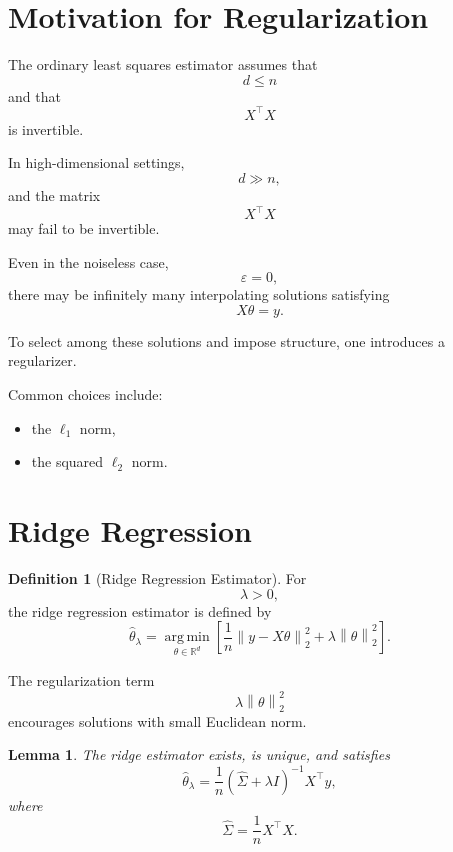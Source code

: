 \documentclass[12pt,oneside]{book}
\numberwithin{equation}{section}
\theoremstyle{definition}
\newtheorem{definition}{Definition}[section]
\theoremstyle{plain}
\newtheorem{lemma}{Lemma}[section]
\theoremstyle{remark}
\newcommand{\R}{\mathbb{R}}
\newcommand{\argmin}{\operatorname*{arg\,min}}
\newcommand{\norm}[1]{\left\lVert #1 \right\rVert}
\begin{document}
\section{Motivation for Regularization}

The ordinary least squares estimator assumes that
\[
d\leq n
\]
and that
\[
X^\top X
\]
is invertible.

In high-dimensional settings,
\[
d\gg n,
\]
and the matrix
\[
X^\top X
\]
may fail to be invertible.

Even in the noiseless case,
\[
\varepsilon=0,
\]
there may be infinitely many interpolating solutions satisfying
\[
X\theta=y.
\]

To select among these solutions and impose structure, one introduces a regularizer.

Common choices include:
\begin{itemize}
\item the $\ell_1$ norm,
\item the squared $\ell_2$ norm.
\end{itemize}

\section{Ridge Regression}

\begin{definition}[Ridge Regression Estimator]
For
\[
\lambda>0,
\]
the ridge regression estimator is defined by
\[
\widehat{\theta}_\lambda
=
\argmin_{\theta\in\R^d}
\left[
\frac{1}{n}\norm{y-X\theta}_2^2
+
\lambda\norm{\theta}_2^2
\right].
\]
\end{definition}

The regularization term
\[
\lambda\norm{\theta}_2^2
\]
encourages solutions with small Euclidean norm.

\begin{lemma}
The ridge estimator exists, is unique, and satisfies
\[
\widehat{\theta}_\lambda
=
\frac{1}{n}
(\widehat{\Sigma}+\lambda I)^{-1}X^\top y,
\]
where
\[
\widehat{\Sigma}
=
\frac{1}{n}X^\top X.
\]
\end{lemma}
\end{document}
